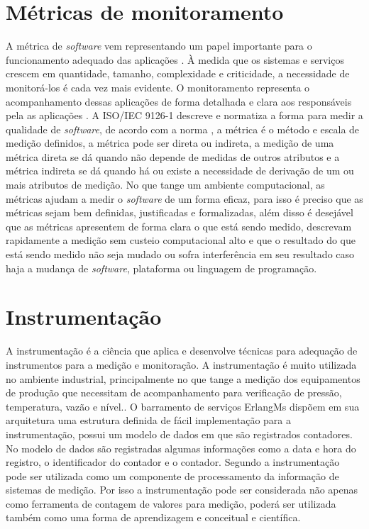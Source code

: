 
\section{Métricas de monitoramento}

A métrica de \textit{software} vem representando um papel importante para o funcionamento adequado das aplicações \cite{de2016metrica}. À medida que os sistemas e serviços crescem em quantidade, tamanho, complexidade e criticidade, a necessidade de monitorá-los é cada vez mais evidente. O monitoramento representa o acompanhamento dessas aplicações de forma detalhada e clara aos responsáveis pela as aplicações \cite{5298441}. A ISO/IEC 9126-1 \cite{associaccao2003nbr} descreve e normatiza a forma para medir a qualidade de \textit{software}, de acordo com a norma \cite{associaccao2003nbr}, a métrica é o método e escala de medição definidos, a métrica pode ser direta ou indireta, a medição de uma métrica direta se dá quando não depende de medidas de outros atributos e a métrica indireta se dá quando há ou existe a necessidade de derivação de um ou mais atributos de medição.
No que tange um ambiente computacional, as métricas ajudam a medir o \textit{software} de um forma eficaz, para isso é preciso que as métricas sejam bem definidas, justificadas e formalizadas, além disso é desejável que as métricas apresentem de forma clara o que está sendo medido, descrevam rapidamente a medição sem custeio computacional alto e que o resultado do que está sendo medido não seja mudado ou sofra interferência em seu resultado caso haja a mudança de \textit{software}, plataforma ou linguagem de programação\cite{meirelles2013monitoramento}.




\section{Instrumentação}

A instrumentação é a ciência que aplica e desenvolve técnicas para adequação de instrumentos para a medição e monitoração. A instrumentação é muito utilizada no ambiente industrial, principalmente no que tange a medição dos equipamentos de produção que necessitam de acompanhamento para verificação de pressão, temperatura, vazão e nível.\cite{ribeiro1999instrumentaccao}. O barramento de serviços ErlangMs dispõem em sua arquitetura uma estrutura definida de fácil implementação para a instrumentação, possui um modelo de dados em que são registrados contadores. No modelo de dados são registradas algumas informações como a data e hora do registro, o identificador do contador e o contador.  
Segundo \cite{frota2008educaccao} a instrumentação pode ser utilizada como um componente de processamento da informação de sistemas de medição. Por isso a instrumentação pode ser considerada não apenas como ferramenta de contagem de valores para medição, poderá ser utilizada também como uma forma de aprendizagem e conceitual e científica.  

